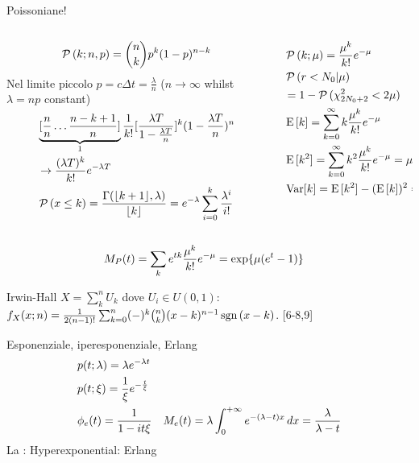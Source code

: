 \documentclass[asd-beamer.tex]{subfiles}%
\begin{document}
\begin{frame}{Poissoniane!}
\begin{columns}[T]
	\begin{column}{0.5\textwidth}
\[\operatorname{\mathcal{P}}{(k;n,p)}=\binom{n}{k}p^k(1-p)^{n-k}\]
Nel limite piccolo $p=c\Delta t=\frac{\lambda}{n}$ ($n\to\infty$ whilst $\lambda=np$ constant)
\begin{align*}
&\underbrace{[\frac{n}{n}\ldots\frac{n-k+1}{n}]}_{1}\frac{1}{k!}[\frac{\lambda T}{1-\frac{\lambda T}{n}}]^k(1-\frac{\lambda T}{n})^n\\
&\to\frac{(\lambda T)^k}{k!}e^{-\lambda T}\\
&\operatorname{\mathcal{P}}{(x\leq k)}=\frac{\Gamma(\lfloor k+1\rfloor,\lambda)}{\lfloor k\rfloor}=e^{-\lambda}\sum_{i=0}^k\frac{\lambda^i}{i!}
\end{align*}
	\end{column}
	\begin{column}{0.5\textwidth}
		\begin{align*}
&\operatorname{\mathcal{P}}{(k;\mu)}=\frac{\mu^k}{k!}e^{-\mu}\\
&\operatorname{\mathcal{P}}{(r<N_0|\mu)}\\
&=1-\operatorname{\mathcal{P}}{(\chi^2_{2N_0+2}<2\mu)}\\
&\operatorname{E}{[k]}=\sum_{k=0}^{\infty}k\frac{\mu^k}{k!}e^{-\mu}\\
&\operatorname{E}{[k^2]}=\sum_{k=0}^{\infty}k^2\frac{\mu^k}{k!}e^{-\mu}=\mu^2+\mu\\
&\operatorname{Var}[k]=\operatorname{E}{[k^2]}-(\operatorname{E}{[k]})^2=\mu
\end{align*}
	\end{column}
\end{columns}
\begin{align*}
&M_P(t)=\sum_ke^{tk}\frac{\mu^k}{k!}e^{-\mu}=\text{exp}\{\mu(e^{t}-1)\}
\end{align*}
\end{frame}

\begin{frame}{Irwin-Hall}
$X=\sum_k^nU_k$ dove $U_i\in U(0,1)$: $f_X(x;n)=\frac{1}{2(n-1)!}\sum_{k=0}^n(-)^k\binom{n}{k}(x-k)^{n-1}\operatorname{sgn}{(x-k)}$.
[6-8,9]
    
\end{frame}

\begin{frame}{Esponenziale, iperesponenziale, Erlang}
\begin{align*}
&p(t;\lambda)=\lambda e^{-\lambda t}\\
&p(t;\xi)=\frac{1}{\xi}e^{-\frac{t}{\xi}}\\
&\phi_e(t)=\frac{1}{1-it\xi}
&M_e(t)=\lambda\int_{0}^{+\infty}{}e^{-(\lambda-t)x}\,dx=\frac{\lambda}{\lambda-t}
\end{align*}
La : 
Hyperexponential:
Erlang
\end{frame}
\end{document}
